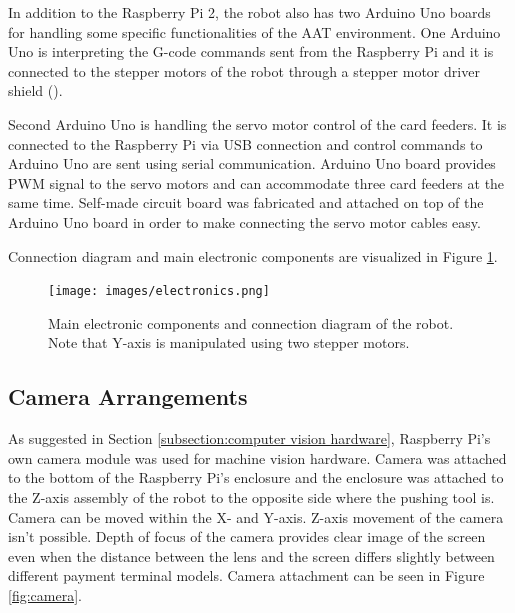 In addition to the Raspberry Pi 2, the robot also has two Arduino Uno boards for handling some specific functionalities of the AAT environment. One Arduino Uno is interpreting the G-code commands sent from the Raspberry Pi and it is connected to the stepper motors of the robot through a stepper motor driver shield (\emph{\cite{grbl_shield}}).

Second Arduino Uno is handling the servo motor control of the card feeders. It is connected to the Raspberry Pi via USB connection and control commands to Arduino Uno are sent using serial communication. Arduino Uno board provides PWM signal to the servo motors and can accommodate three card feeders at the same time. Self-made circuit board was fabricated and attached on top of the Arduino Uno board in order to make connecting the servo motor cables easy.

Connection diagram and main electronic components are visualized in Figure \ref{fig:electronics}.

\begin{figure}[ht]
  \begin{center}
    \texttt{[image: images/electronics.png]}
    \caption{Main electronic components and connection diagram of the robot. Note that Y-axis is manipulated using two stepper motors.}
    \label{fig:electronics}
  \end{center}
\end{figure}
\FloatBarrier

\subsection{Camera Arrangements}
\label{subsection:Camera Arrangements}

As suggested in Section \ref{subsection:computer vision hardware}, Raspberry Pi's own camera module was used for machine vision hardware. Camera was attached to the bottom of the Raspberry Pi's enclosure and the enclosure was attached to the Z-axis assembly of the robot to the opposite side where the pushing tool is. Camera can be moved within the X- and Y-axis. Z-axis movement of the camera isn't possible. Depth of focus of the camera provides clear image of the screen even when the distance between the lens and the screen differs slightly between different payment terminal models. Camera attachment can be seen in Figure \ref{fig:camera}.

